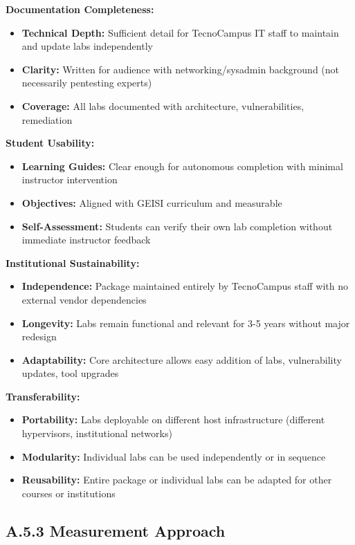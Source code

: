 \textbf{Documentation Completeness:}
\begin{itemize}
    \item \textbf{Technical Depth:} Sufficient detail for TecnoCampus IT staff to maintain and update labs independently
    \item \textbf{Clarity:} Written for audience with networking/sysadmin background (not necessarily pentesting experts)
    \item \textbf{Coverage:} All labs documented with architecture, vulnerabilities, remediation
\end{itemize}


\textbf{Student Usability:}
\begin{itemize}
    \item \textbf{Learning Guides:} Clear enough for autonomous completion with minimal instructor intervention
    \item \textbf{Objectives:} Aligned with GEISI curriculum and measurable
    \item \textbf{Self-Assessment:} Students can verify their own lab completion without immediate instructor feedback
\end{itemize}


\textbf{Institutional Sustainability:}
\begin{itemize}
    \item \textbf{Independence:} Package maintained entirely by TecnoCampus staff with no external vendor dependencies
    \item \textbf{Longevity:} Labs remain functional and relevant for 3-5 years without major redesign
    \item \textbf{Adaptability:} Core architecture allows easy addition of labs, vulnerability updates, tool upgrades
\end{itemize}


\textbf{Transferability:}
\begin{itemize}
    \item \textbf{Portability:} Labs deployable on different host infrastructure (different hypervisors, institutional networks)
    \item \textbf{Modularity:} Individual labs can be used independently or in sequence
    \item \textbf{Reusability:} Entire package or individual labs can be adapted for other courses or institutions
\end{itemize}


\subsection*{A.5.3 Measurement Approach}


